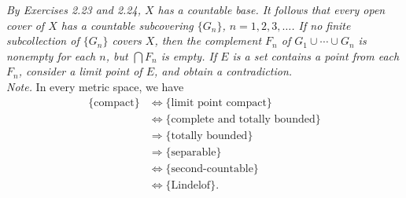 \documentclass{article}
\begin{document}
\emph{By Exercises 2.23 and 2.24, $X$ has a countable base.
It follows that every open cover of $X$ has a countable subcovering $\{G_n\}$,
$n = 1, 2, 3, \ldots$.
If no finite subcollection of $\{G_n\}$ covers $X$,
then the complement $F_n$ of $G_1 \cup \cdots \cup G_n$
is nonempty for each $n$, but $\bigcap F_n$ is empty.
If $E$ is a set contains a point from each $F_n$,
consider a limit point of $E$, and obtain a contradiction.} \\

\emph{Note.} In every metric space, we have
\begin{align*}
\{ \text{compact} \}
&\Longleftrightarrow
\{ \text{limit point compact} \} \\
&\Longleftrightarrow
\{ \text{complete and totally bounded} \} \\
&\Longrightarrow
\{ \text{totally bounded} \} \\
&\Longrightarrow
\{ \text{separable} \} \\
&\Longleftrightarrow
\{ \text{second-countable} \} \\
&\Longleftrightarrow
\{ \text{Lindelof} \}. \\
\end{align*}
\end{document}
